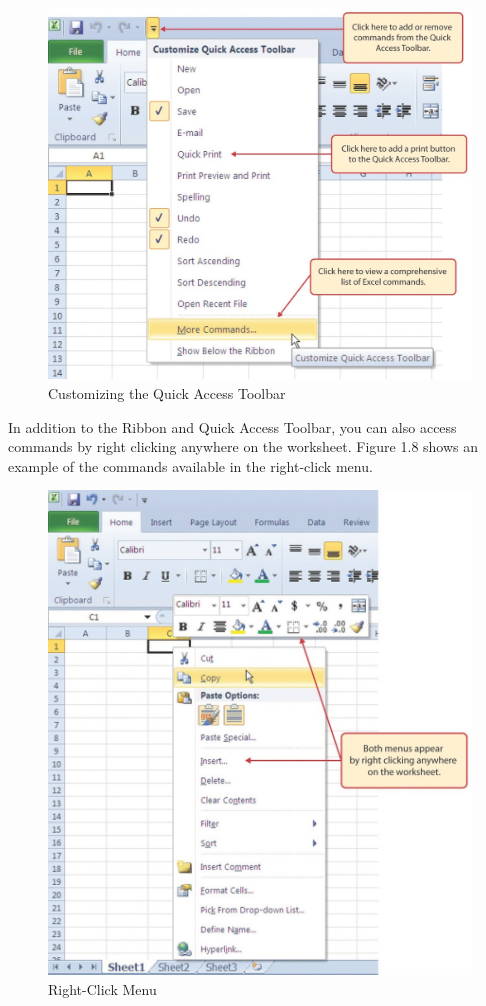 \begin{figure}[H]
	\centering
	\includegraphics[width=\maxwidth{.95\linewidth}]{gfx/Ch01_fig07}
	\caption{Customizing the Quick Access Toolbar}
	\label{01:fig07}
\end{figure}

In addition to the Ribbon and Quick Access Toolbar, you can also access commands by right clicking anywhere on the worksheet. Figure 1.8 shows an example of the commands available in the right-click menu.

\begin{figure}[H]
	\centering
	\includegraphics[width=\maxwidth{.95\linewidth}]{gfx/Ch01_fig08}
	\caption{Right-Click Menu}
	\label{01:fig08}
\end{figure}

